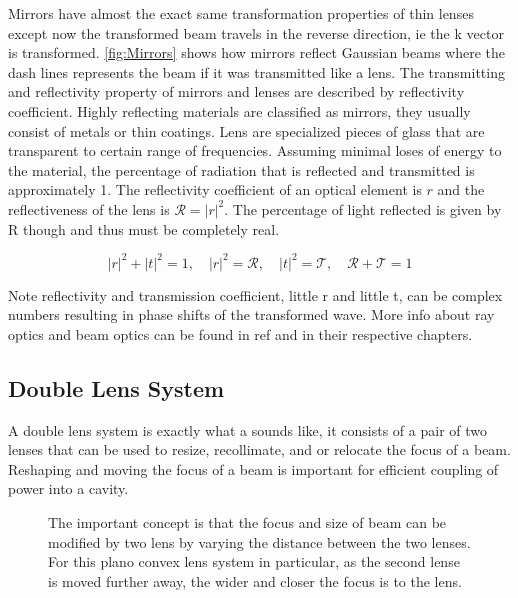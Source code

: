 \documentclass[11pt,a4paper]{book}
\newcommand{\imginput}[1]{} %
\begin{document}
		Mirrors have almost the exact same transformation properties of thin lenses except now the transformed beam travels in the reverse direction, ie the k vector is transformed. \autoref{fig:Mirrors} shows how mirrors reflect Gaussian beams where the dash lines represents the beam if it was transmitted like a lens.
		The transmitting and reflectivity property of mirrors and lenses are described by reflectivity coefficient. 
		Highly reflecting materials are classified as mirrors, they usually consist of metals or thin coatings. 
		Lens are specialized pieces of glass that are transparent to certain range of frequencies.
		Assuming minimal loses of energy to the material, the percentage of radiation that is reflected and transmitted is approximately 1. 
		The reflectivity coefficient of an optical element is $r$ and the reflectiveness of the lens is $\mathcal{R}=|r|^2$. The percentage of light reflected is given by R though and thus must be completely real.
		
		\begin{equation}\label{reflectivity}
			|r|^2+|t|^2=1, \quad |r|^2=\mathcal{R}, \quad |t|^2=\mathcal{T}, \quad \mathcal{R}+\mathcal{T}=1
		\end{equation}
		
		Note reflectivity and transmission coefficient, little r and little t, can be complex numbers resulting in phase shifts of the transformed wave. More info about ray optics and beam optics can be found in ref\cite{SalehTeichs} and \cite{steck} in their respective chapters.
		
		\subsection{Double Lens System}
			\label{subsec:Double Lens System}
			A double lens system is exactly what a sounds like, it consists of a pair of two lenses that can be used to resize, recollimate, and or relocate the focus of a beam. Reshaping and moving the focus of a beam is important for efficient coupling of power into a cavity.
			
			\begin{figure} [!ht]
				\centering
				\def\svgwidth{\columnwidth}
				\resizebox{160mm}{!}{\imginput{images/double-lens-system.pdf_tex}}
				\caption{The important concept is that the focus and size of beam can be modified by two lens by varying the distance between the two lenses. For this plano convex lens system in particular, as the second lense is moved further away, the wider and closer the focus is to the lens.
				}
				\label{fig:double-lens-system}
			\end{figure}
\end{document}

